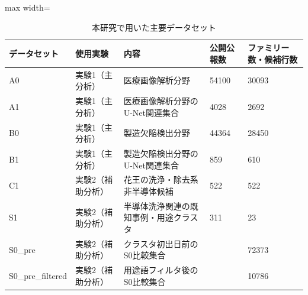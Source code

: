 \begin{table}[tbp]
\centering
\small
\caption{本研究で用いた主要データセット}
\label{tab:dataset_summary_table}
\begin{adjustbox}{max width=\textwidth}
\begin{tabular}{lllll}
\toprule
データセット & 使用実験 & 内容 & 公開公報数 & ファミリー数・候補行数 \\
\midrule
A0 & 実験1（主分析） & 医療画像解析分野 & 54100 & 30093 \\
A1 & 実験1（主分析） & 医療画像解析分野のU-Net関連集合 & 4028 & 2692 \\
B0 & 実験1（主分析） & 製造欠陥検出分野 & 44364 & 28450 \\
B1 & 実験1（主分析） & 製造欠陥検出分野のU-Net関連集合 & 859 & 610 \\
C1 & 実験2（補助分析） & 花王の洗浄・除去系非半導体候補 & 522 & 522 \\
S1 & 実験2（補助分析） & 半導体洗浄関連の既知事例・用途クラスタ & 311 & 23 \\
S0\_pre & 実験2（補助分析） & クラスタ初出日前のS0比較集合 &  & 72373 \\
S0\_pre\_filtered & 実験2（補助分析） & 用途語フィルタ後のS0比較集合 &  & 10786 \\
\bottomrule
\end{tabular}
\end{adjustbox}
\end{table}
